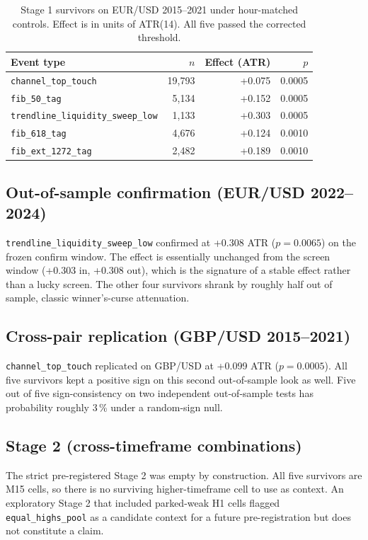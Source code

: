 \documentclass[11pt,a4paper]{article}
\begin{document}
\begin{table}[h]
\centering
\caption{Stage 1 survivors on EUR/USD 2015--2021 under hour-matched
controls. Effect is in units of ATR(14). All five passed the corrected
threshold.}
\label{tab:stage1}
\begin{tabular}{lrrr}
\toprule
Event type & $n$ & Effect (ATR) & $p$ \\
\midrule
\texttt{channel\_top\_touch} & 19{,}793 & +0.075 & 0.0005 \\
\texttt{fib\_50\_tag} & 5{,}134 & +0.152 & 0.0005 \\
\texttt{trendline\_liquidity\_sweep\_low} & 1{,}133 & +0.303 & 0.0005 \\
\texttt{fib\_618\_tag} & 4{,}676 & +0.124 & 0.0010 \\
\texttt{fib\_ext\_1272\_tag} & 2{,}482 & +0.189 & 0.0010 \\
\bottomrule
\end{tabular}
\end{table}

\subsection{Out-of-sample confirmation (EUR/USD 2022--2024)}

\texttt{trendline\_liquidity\_sweep\_low} confirmed at +0.308 ATR
($p=0.0065$) on the frozen confirm window. The effect is essentially
unchanged from the screen window (+0.303 in, +0.308 out), which is the
signature of a stable effect rather than a lucky screen. The other four
survivors shrank by roughly half out of sample, classic winner's-curse
attenuation.

\subsection{Cross-pair replication (GBP/USD 2015--2021)}

\texttt{channel\_top\_touch} replicated on GBP/USD at +0.099 ATR
($p=0.0005$). All five survivors kept a positive sign on this second
out-of-sample look as well. Five out of five sign-consistency on two
independent out-of-sample tests has probability roughly 3\,\% under a
random-sign null.

\subsection{Stage 2 (cross-timeframe combinations)}

The strict pre-registered Stage 2 was empty by construction. All five
survivors are M15 cells, so there is no surviving higher-timeframe cell
to use as context. An exploratory Stage 2 that included parked-weak
H1 cells flagged \texttt{equal\_highs\_pool} as a candidate context for
a future pre-registration but does not constitute a claim.
\end{document}
